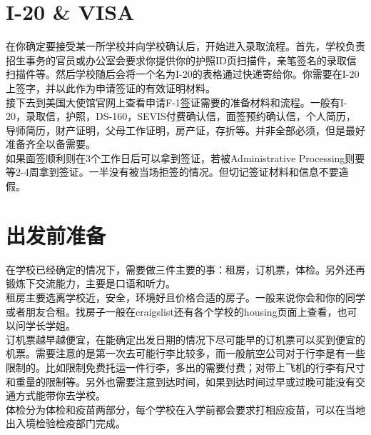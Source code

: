 \documentclass{article}
\begin{document}
\section{I-20 \& VISA}
在你确定要接受某一所学校并向学校确认后，开始进入录取流程。首先，学校负责招生事务的官员或办公室会要求你提供你的护照ID页扫描件，亲笔签名的录取信扫描件等。然后学校随后会将一个名为I-20的表格通过快递寄给你。你需要在I-20上签字，并以此作为申请签证的有效证明材料。\\
\indent 接下去到美国大使馆官网上查看申请F-1签证需要的准备材料和流程。一般有I-20，录取信，护照，DS-160，SEVIS付费确认信，面签预约确认信，个人简历，导师简历，财产证明，父母工作证明，房产证，存折等。并非全部必须，但是最好准备齐全以备需要。\\
\indent 如果面签顺利则在3个工作日后可以拿到签证，若被Administrative Processing则要等2-4周拿到签证。一半没有被当场拒签的情况。但切记签证材料和信息不要造假。

\section{出发前准备}
在学校已经确定的情况下，需要做三件主要的事：租房，订机票，体检。另外还再锻炼下交流能力，主要是口语和听力。\\
\indent 租房主要选离学校近，安全，环境好且价格合适的房子。一般来说你会和你的同学或者朋友合租。找房子一般在craigslist还有各个学校的housing页面上查看，也可以问学长学姐。\\
\indent 订机票越早越便宜，在能确定出发日期的情况下尽可能早的订机票可以买到便宜的机票。需要注意的是第一次去可能行李比较多，而一般航空公司对于行李是有一些限制的。比如限制免费托运一件行李，多出的需要付费；对带上飞机的行李有尺寸和重量的限制等。另外也需要注意到达时间，如果到达时间过早或过晚可能没有交通方式能带你去学校。\\
\indent 体检分为体检和疫苗两部分，每个学校在入学前都会要求打相应疫苗，可以在当地出入境检验检疫部门完成。
\end{document}
